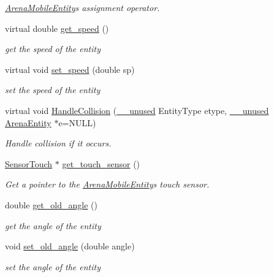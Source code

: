 \begin{DoxyCompactItemize}
\begin{DoxyCompactList}\small\item\em \hyperlink{classArenaMobileEntity}{Arena\+Mobile\+Entity}\textquotesingle{}s assignment operator. \end{DoxyCompactList}\item 
virtual double \hyperlink{classArenaMobileEntity_a2116341414a3ad0449dc03efa6ea500b}{get\+\_\+speed} ()
\begin{DoxyCompactList}\small\item\em get the speed of the entity \end{DoxyCompactList}\item 
virtual void \hyperlink{classArenaMobileEntity_a1a047f4377a9557516a2e1d6d73db849}{set\+\_\+speed} (double sp)
\begin{DoxyCompactList}\small\item\em set the speed of the entity \end{DoxyCompactList}\item 
virtual void \hyperlink{classArenaMobileEntity_ab3f69b154837611177c56d85dd2cd71a}{Handle\+Collision} (\hyperlink{common_8h_a2e3484535ee610c8e19e9859563abe48}{\+\_\+\+\_\+unused} Entity\+Type etype, \hyperlink{common_8h_a2e3484535ee610c8e19e9859563abe48}{\+\_\+\+\_\+unused} \hyperlink{classArenaEntity}{Arena\+Entity} $\ast$e=N\+U\+LL)\hypertarget{classArenaMobileEntity_ab3f69b154837611177c56d85dd2cd71a}{}\label{classArenaMobileEntity_ab3f69b154837611177c56d85dd2cd71a}

\begin{DoxyCompactList}\small\item\em Handle collision if it occurs. \end{DoxyCompactList}\item 
\hyperlink{classSensorTouch}{Sensor\+Touch} $\ast$ \hyperlink{classArenaMobileEntity_ae9507f1b0c6bfdfd62afbab8a9a150f7}{get\+\_\+touch\+\_\+sensor} ()\hypertarget{classArenaMobileEntity_ae9507f1b0c6bfdfd62afbab8a9a150f7}{}\label{classArenaMobileEntity_ae9507f1b0c6bfdfd62afbab8a9a150f7}

\begin{DoxyCompactList}\small\item\em Get a pointer to the \hyperlink{classArenaMobileEntity}{Arena\+Mobile\+Entity}\textquotesingle{}s touch sensor. \end{DoxyCompactList}\item 
double \hyperlink{classArenaMobileEntity_a29299762b59e4d3c1038816f8c526bba}{get\+\_\+old\+\_\+angle} ()
\begin{DoxyCompactList}\small\item\em get the angle of the entity \end{DoxyCompactList}\item 
void \hyperlink{classArenaMobileEntity_ad5ac890266de5cd84b1b032180ba147a}{set\+\_\+old\+\_\+angle} (double angle)
\begin{DoxyCompactList}\small\item\em set the angle of the entity \end{DoxyCompactList}\end{DoxyCompactItemize}
